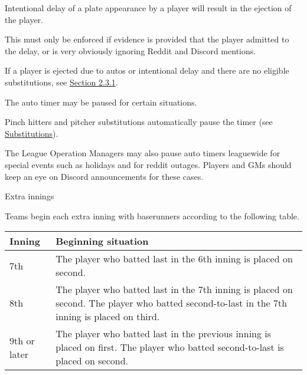 \begin{deepEnumerate}
\begin{deepEnumerate}
\begin{deepEnumerate}
\begin{deepEnumerate}
			\end{deepEnumerate}
			\item Intentional delay of a plate appearance by a player will result in the ejection of the player.
			\begin{deepEnumerate}
				\item This must only be enforced if evidence is provided that the player admitted to the delay, or is very obviously ignoring Reddit and Discord mentions.
			\end{deepEnumerate}
		\end{deepEnumerate}
		\item If a player is ejected due to autos or intentional delay and there are no eligible substitutions, see \hyperref[sec:lineups]{Section 2.3.1}.
		\item The auto timer may be paused for certain situations.
		\begin{deepEnumerate}
			\item Pinch hitters and pitcher substitutions automatically pause the timer (see \hyperref[sec:substitutions]{Substitutions}).
			\item The League Operation Managers may also pause auto timers leaguewide for special events such as holidays and for reddit outages.
			Players and GMs should keep an eye on Discord announcements for these cases.
		\end{deepEnumerate}
	\end{deepEnumerate}
	\item Extra innings
	\label{sec:extra innings}
	\begin{deepEnumerate}
		\item Teams begin each extra inning with baserunners according to the following table.
		\begin{center}										                
			\begin{longtable}{|p{3cm}|p{8cm}|}
				\hline
				\textbf{Inning} & \textbf{Beginning situation}                                          \\
				\hline
				7th             & The player who batted last in the 6th inning is placed on second.     \\
				\hline
				8th             & The player who batted last in the 7th inning is placed on second.     
				The player who batted second-to-last in the 7th inning is placed on third. \\
				\hline
				9th or later    & The player who batted last in the previous inning is placed on first. 
				The player who batted second-to-last is placed on second.

\end{longtable}
\end{center}
\end{deepEnumerate}
\end{deepEnumerate}
